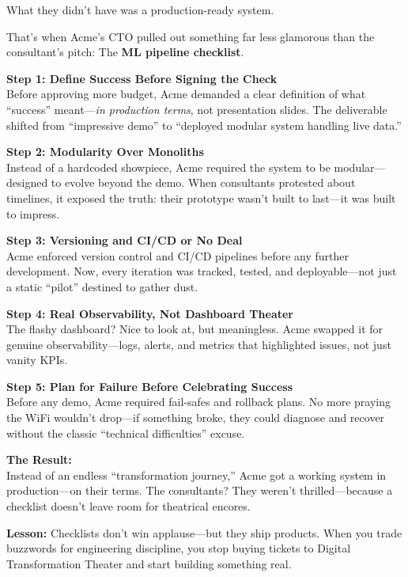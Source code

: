 What they didn’t have was a production-ready system.

That’s when Acme’s CTO pulled out something far less glamorous than the consultant’s pitch:  The \textbf{ML pipeline checklist}.

\textbf{Step 1: Define Success Before Signing the Check} \\
Before approving more budget, Acme demanded a clear definition of what ``success'' meant—\textit{in production terms}, not presentation slides. The deliverable shifted from ``impressive demo'' to ``deployed modular system handling live data.''

\textbf{Step 2: Modularity Over Monoliths} \\
Instead of a hardcoded showpiece, Acme required the system to be modular—designed to evolve beyond the demo. When consultants protested about timelines, it exposed the truth: their prototype wasn’t built to last—it was built to impress.

\textbf{Step 3: Versioning and CI/CD or No Deal} \\
Acme enforced version control and CI/CD pipelines before any further development. Now, every iteration was tracked, tested, and deployable—not just a static ``pilot'' destined to gather dust.

\textbf{Step 4: Real Observability, Not Dashboard Theater} \\
The flashy dashboard? Nice to look at, but meaningless. Acme swapped it for genuine observability—logs, alerts, and metrics that highlighted issues, not just vanity KPIs.


\textbf{Step 5: Plan for Failure Before Celebrating Success} \\
Before any demo, Acme required fail-safes and rollback plans. No more praying the WiFi wouldn’t drop—if something broke, they could diagnose and recover without the classic ``technical difficulties'' excuse.

\textbf{The Result:} \\
Instead of an endless ``transformation journey,'' Acme got a working system in production—on their terms. The consultants? They weren’t thrilled—because a checklist doesn’t leave room for theatrical encores.


\textbf{Lesson:} Checklists don’t win applause—but they ship products. When you trade buzzwords for engineering discipline, you stop buying tickets to Digital Transformation Theater and start building something real.


